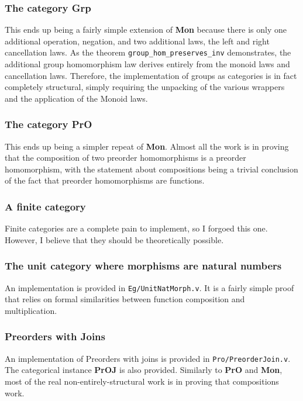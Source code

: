 \documentclass[12pt,twocolumn,oneside]{book}
\begin{document}
\subsubsection{The category \textbf{Grp}}

This ends up being a fairly simple extension of \textbf{Mon} because there is only
one additional operation, negation, and two additional laws, the left and right
cancellation laws. As the theorem \texttt{group\_hom\_preserves\_inv} demonstrates,
the additional group homomorphism law derives entirely from the monoid laws and
cancellation laws. Therefore, the implementation of groups as categories is in
fact completely structural, simply requiring the unpacking of the various wrappers
and the application of the Monoid laws.

\subsubsection{The category \textbf{PrO}}

This ends up being a simpler repeat of \textbf{Mon}. Almost all the work is in
proving that the composition of two preorder homomorphisms is a preorder
homomorphism, with the statement about compositions being a trivial conclusion of
the fact that preorder homomorphisms are functions.

\subsubsection{A finite category}

Finite categories are a complete pain to implement, so I forgoed this one. However,
I believe that they should be theoretically possible.

\subsubsection{The unit category where morphisms are natural numbers}

An implementation is provided in \texttt{Eg/UnitNatMorph.v}. It is a fairly simple
proof that relies on formal similarities between function composition and multiplication.

\subsubsection{Preorders with Joins}

An implementation of Preorders with joins is provided in \texttt{Pro/PreorderJoin.v}.
The categorical instance \textbf{PrOJ} is also provided. Similarly to \textbf{PrO}
and \textbf{Mon}, most of the real non-entirely-structural work is in proving that
compositions work.
\end{document}
